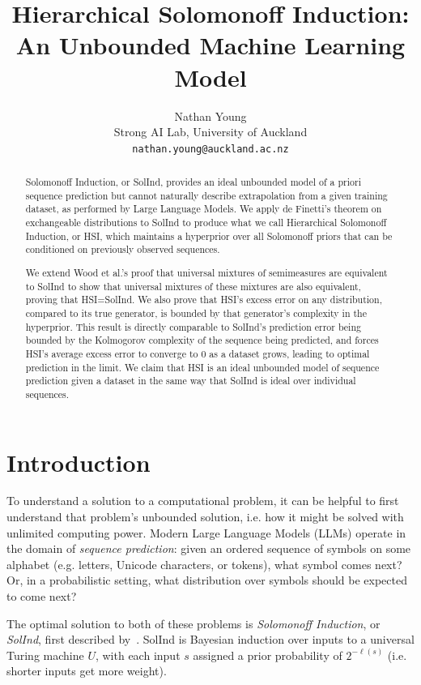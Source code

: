 \documentclass[11pt]{article}
\title{Hierarchical Solomonoff Induction: An Unbounded Machine Learning Model}
\author{
    Nathan Young\\
    Strong AI Lab, University of Auckland\\
    \texttt{nathan.young@auckland.ac.nz}
}
\date{}
\begin{document}
\maketitle

\begin{abstract}
Solomonoff Induction, or SolInd, provides an ideal unbounded model of a priori sequence prediction but cannot naturally describe extrapolation from a given training dataset, as performed by Large Language Models.
We apply de Finetti's theorem on exchangeable distributions to SolInd to produce what we call Hierarchical Solomonoff Induction, or HSI, which maintains a hyperprior over all Solomonoff priors that can be conditioned on previously observed sequences.

We extend Wood et al.'s proof that universal mixtures of semimeasures are equivalent to SolInd to show that universal mixtures of these mixtures are also equivalent, proving that HSI=SolInd.
We also prove that HSI's excess error on any distribution, compared to its true generator, is bounded by that generator's complexity in the hyperprior. This result is directly comparable to SolInd's prediction error being bounded by the Kolmogorov complexity of the sequence being predicted, and forces HSI's average excess error to converge to 0 as a dataset grows, leading to optimal prediction in the limit.
We claim that HSI is an ideal unbounded model of sequence prediction given a dataset in the same way that SolInd is ideal over individual sequences.
\end{abstract}

\section{Introduction}
To understand a solution to a computational problem, it can be helpful to first understand that problem's unbounded solution, i.e. how it might be solved with unlimited computing power.
Modern Large Language Models (LLMs) operate in the domain of \textit{sequence prediction}: given an ordered sequence of symbols on some alphabet (e.g. letters, Unicode characters, or tokens), what symbol comes next? Or, in a probabilistic setting, what distribution over symbols should be expected to come next?

The optimal solution to both of these problems is \textit{Solomonoff Induction}, or \textit{SolInd}, first described by~\citet{Solomonoff1964}.
SolInd is Bayesian induction over inputs to a universal Turing machine $U$, with each input $s$ assigned a prior probability of $2^{-\ell(s)}$ (i.e. shorter inputs get more weight).
\end{document}
